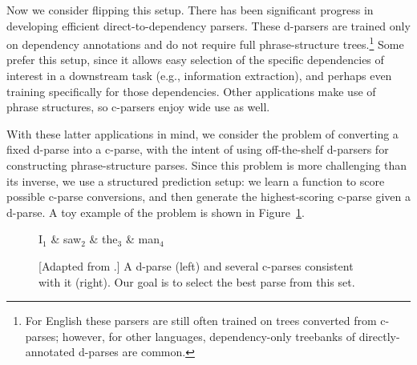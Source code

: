 \documentclass[11pt,letterpaper]{article}
\newcommand{\nascomment}[1]{\textcolor{blue}{\bf \small [#1 --nas]}}
\begin{document}
Now we consider flipping this setup. There has been significant
progress in developing efficient direct-to-dependency parsers. These
d-parsers are trained only on dependency annotations and do not
require full phrase-structure trees.\footnote{For English these
  parsers are still often trained on trees converted from c-parses;
  however, for other languages, dependency-only treebanks of
  directly-annotated d-parses are common.}  
Some prefer this setup, since it allows easy selection of the specific
dependencies of interest in a downstream task (e.g., information
extraction), and perhaps even training specifically for those
dependencies.  Other applications make use of phrase structures, so
c-parsers enjoy wide use as well.




With these latter applications in mind, we consider the problem of
converting a fixed d-parse into a c-parse, with the intent of
using off-the-shelf d-parsers for constructing phrase-structure
parses.  Since this problem is more challenging than its inverse, we
use a structured prediction setup: we learn a function to score
possible c-parse conversions, and then generate the highest-scoring
c-parse given a d-parse. A toy example of the problem is shown in
Figure~\ref{fig:inverse}.



\begin{figure}
  \centering

  \vspace{-1cm}
  \begin{dependency}[theme=simple]
    \begin{deptext}[column sep=0.7cm]
      I$_1$ \& saw$_2$ \& the$_3$ \& man$_4$ \\
    \end{deptext}
  \end{dependency}   \vspace{-0.1cm} 

  
  \caption{{
      [Adapted from \cite{collins1999statistical}.] A d-parse (left)
      and several c-parses consistent with it (right).  Our goal is to select
      the best parse from this set. \label{fig:inverse}
    }
    }
\end{figure}
\end{document}
